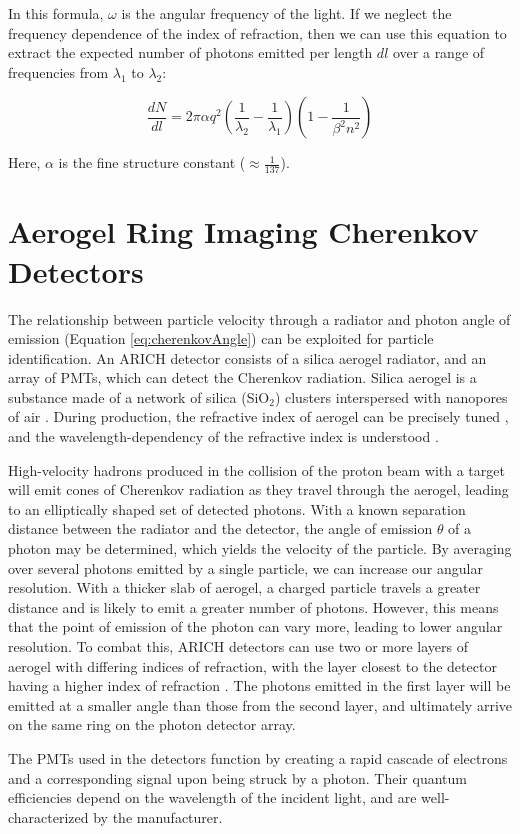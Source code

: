In this formula, $\omega$ is the angular frequency of the light. If we neglect the frequency dependence of the index of refraction, then we can use this equation to extract the expected number of photons emitted per length $dl$ over a range of frequencies from $\lambda_1$ to $\lambda_2$:

\begin{equation}
    \label{eq:photonNumber}
    \frac{dN}{dl}  = 2\pi\alpha q^2 \left(\frac{1}{\lambda_2} - \frac{1}{\lambda_1}
    \right)\left(1 - \frac{1}{\beta^2n^2}\right)
\end{equation}

Here, $\alpha$ is the fine structure constant ($\approx \frac{1}{137}$).



\section{Aerogel Ring Imaging Cherenkov Detectors}
\label{sec:ARICH}
The relationship between particle velocity through a radiator and photon angle of emission (Equation \ref{eq:cherenkovAngle}) can be exploited for particle identification. An \ac{ARICH} detector consists of a silica aerogel radiator, and an array of \ac{PMT}s, which can detect the Cherenkov radiation. Silica aerogel is a substance made of a network of silica (SiO$_2$) clusters interspersed with nanopores of air \cite{aerogelRefraction}. During production, the refractive index of aerogel can be precisely tuned \cite{aerogelRefraction}, and the wavelength-dependency of the refractive index is  understood \cite{aerogelWavelength}. 

High-velocity hadrons produced in the collision of the proton beam with a target will emit cones of Cherenkov radiation as they travel through the aerogel, leading to an elliptically shaped set of detected photons. With a known separation distance between the radiator and the detector, the angle of emission $\theta$ of a photon may be determined, which yields the velocity of the particle. By averaging over several photons emitted by a single particle, we can increase our angular resolution. With a thicker slab of aerogel, a charged particle travels a greater distance and is likely to emit a greater number of photons. However, this means that the point of emission of the photon can vary more, leading to lower angular resolution. To combat this, \ac{ARICH} detectors can use two or more layers of aerogel with differing indices of refraction, with the layer closest to the detector having a higher index of refraction \cite{belleArich}. The photons emitted in the first layer will be emitted at a smaller angle than those from the second layer, and ultimately arrive on the same ring on the photon detector array.

The \ac{PMT}s used in the detectors function by creating a rapid cascade of electrons and a corresponding signal upon being struck by a photon. Their quantum efficiencies depend on the wavelength of the incident light, and are well-characterized by the manufacturer.


\endinput

Any text after an \endinput is ignored.
You could put scraps here or things in progress.
